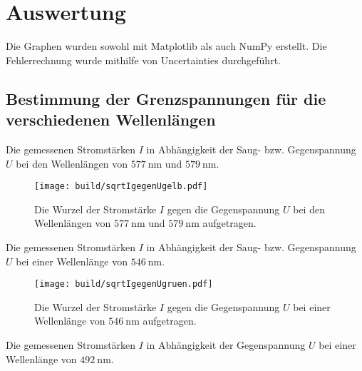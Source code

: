 \section{Auswertung}
\label{sec:Auswertung}

Die Graphen wurden sowohl mit Matplotlib \cite{matplotlib} als auch NumPy \cite{numpy} erstellt. Die
 Fehlerrechnung wurde mithilfe von Uncertainties \cite{uncertainties} durchgeführt.

\subsection{Bestimmung der Grenzspannungen für die verschiedenen Wellenlängen}
\begin{center}
	\begin{table}
		\caption{Die gemessenen Stromstärken $I$ in Abhängigkeit der Saug- bzw. Gegenspannung $U$ bei den Wellenlängen von $\SI{577}{\nano\meter}$ und $ \SI{579}{\nano\meter}$.}
		\begin{minipage}[t]{0.5\textwidth}
			\centering
			
		\end{minipage}
		\begin{minipage}[t]{0.5\textwidth}
			\centering
			
		\end{minipage}
	\end{table}
\end{center}
\begin{figure}
	\centering
	\caption{Die Wurzel der Stromstärke $I$ gegen die Gegenspannung $U$ bei den Wellenlängen von $\SI{577}{\nano\meter}$ und $ \SI{579}{\nano\meter}$ aufgetragen.}
	\texttt{[image: build/sqrtIgegenUgelb.pdf]}
	\label{fig:Graphgelb1}
\end{figure}
\begin{table}
	\centering
	\caption{Die gemessenen Stromstärken $I$ in Abhängigkeit der Saug- bzw. Gegenspannung $U$ bei einer Wellenlänge von $\SI{546}{\nano\meter}$.}
	
\end{table}
\begin{figure}
	\centering
	\caption{Die Wurzel der Stromstärke $I$ gegen die Gegenspannung $U$ bei einer Wellenlänge von $\SI{546}{\nano\meter}$ aufgetragen.}
	\texttt{[image: build/sqrtIgegenUgruen.pdf]}
	\label{fig:Graphgruen}
\end{figure}
\begin{table}
	\centering
	\caption{Die gemessenen Stromstärken $I$ in Abhängigkeit der Gegenspannung $U$ bei einer Wellenlänge von $\SI{492}{\nano\meter}$.}
	
\end{table}
